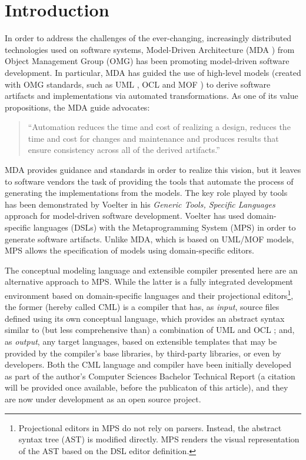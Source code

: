 \section{Introduction}
%
In order to address the challenges of the ever-changing,
increasingly distributed technologies used on software systems,
Model-Driven Architecture (MDA \cite{mda}) from Object Management Group (OMG)
has been promoting model-driven software development.
In particular, MDA has guided the use of high-level models (created with OMG standards,
such as UML \cite{uml}, OCL \cite{ocl} and MOF \cite{mof}) to derive software artifacts and implementations via automated transformations.
As one of its value propositions, the MDA guide \cite{mda} advocates:

\begin{quote}``Automation reduces the time and cost of realizing a design,
reduces the time and cost for changes and maintenance and produces results that ensure consistency across all of the derived artifacts.''\end{quote}

MDA provides guidance and standards in order to realize this vision,
but it leaves to software vendors the task of providing the tools that automate the process of generating the implementations from the models.
The key role played by tools has been demonstrated by Voelter \cite{voelter} in his \emph{Generic Tools, Specific Languages} approach for model-driven software development.
Voelter \cite{voelter} has used domain-specific languages (DSLs) with the Metaprogramming System (MPS) in order to generate software artifacts.
Unlike MDA, which is based on UML/MOF models,
MPS allows the specification of models using domain-specific editors.

The conceptual modeling language and extensible compiler presented here are an alternative approach to MPS.
While the latter is a fully integrated development environment based on domain-specific languages and their projectional editors\footnote{Projectional
editors in MPS do not rely on parsers.
Instead, the abstract syntax tree (AST) is modified directly.
MPS renders the visual representation of the AST based on the DSL editor definition.},
the former (hereby called CML) is a compiler that has,
as \emph{input}, source files defined using its own conceptual language,
which provides an abstract syntax similar to (but less comprehensive than) a combination of UML \cite{uml} and OCL \cite{ocl};
and, as \emph{output}, any target languages,
based on extensible templates that may be provided by the compiler's base libraries, by third-party libraries, or even by developers. Both the CML language and compiler have been initially developed as part of the author's Computer Sciences Bachelor Technical Report
(a citation will be provided once available, before the publicaton of this article),
and they are now under development \cite{cml-repo} as an open source project.

